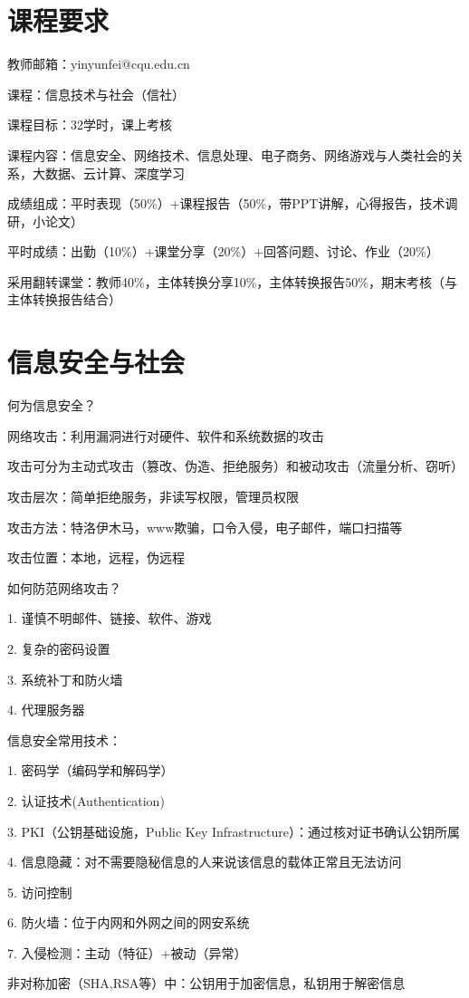 \section*{课程要求}%
\label{sec:课程要求}
教师邮箱：yinyunfei@cqu.edu.cn

课程：信息技术与社会（信社）

课程目标：32学时，课上考核

课程内容：信息安全、网络技术、信息处理、电子商务、网络游戏与人类社会的关系，大数据、云计算、深度学习

成绩组成：平时表现（50\%）+课程报告（50\%，带PPT讲解，心得报告，技术调研，小论文）

平时成绩：出勤（10\%）+课堂分享（20\%）+回答问题、讨论、作业（20\%）

采用翻转课堂：教师40\%，主体转换分享10\%，主体转换报告50\%，期末考核（与主体转换报告结合）

\section{信息安全与社会}%
\label{sec:信息安全与社会}
\begin{question}
    何为信息安全？
\end{question}
\begin{notation}
    网络攻击：利用漏洞进行对硬件、软件和系统数据的攻击
\end{notation}
攻击可分为主动式攻击（篡改、伪造、拒绝服务）和被动攻击（流量分析、窃听）

攻击层次：简单拒绝服务，非读写权限，管理员权限

攻击方法：特洛伊木马，www欺骗，口令入侵，电子邮件，端口扫描等

攻击位置：本地，远程，伪远程
\begin{question}
    如何防范网络攻击？
\end{question}
1. 谨慎不明邮件、链接、软件、游戏

2. 复杂的密码设置

3. 系统补丁和防火墙

4. 代理服务器

\begin{notation}
    信息安全常用技术：

    1. 密码学（编码学和解码学）

    2. 认证技术(Authentication)

    3. PKI（公钥基础设施，Public Key Infrastructure）：通过核对证书确认公钥所属

    4. 信息隐藏：对不需要隐秘信息的人来说该信息的载体正常且无法访问

    5. 访问控制

    6. 防火墙：位于内网和外网之间的网安系统

    7. 入侵检测：主动（特征）+被动（异常）
\end{notation}
\begin{notation}
    非对称加密（SHA,RSA等）中：公钥用于加密信息，私钥用于解密信息
\end{notation}
